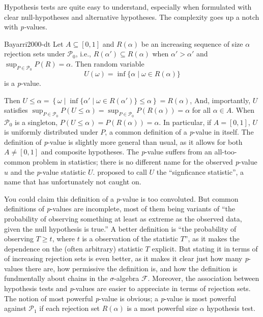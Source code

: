 Hypothesis tests are quite easy to understand, especially when formulated
with clear null-hypotheses and alternative hypotheses. The complexity
goes up a notch with \emph{p-}values.
\begin{definition}
\label{def:p-value}\parencite[][Chapter 3.3]{Lehmann2005-sp}{Bayarri2000-dt} Let
$A\subseteq[0,1]$ and $R(\alpha)$ be an increasing sequence of size
$\alpha$ rejection sets under $\mathcal{P}_{0}$, i.e., $R(\alpha')\subseteq R(\alpha)$
when $\alpha'>\alpha'$ and $\sup_{P\in\mathcal{P}_{0}}P(R)=\alpha$.
Then random variable
\begin{equation}
U(\omega)=\inf\{\alpha\mid\omega\in R(\alpha)\}\label{eq:size p-value}
\end{equation}
is a \emph{p}-value. 
\end{definition}

Then $U\leq\alpha=\left\{ \omega\mid\inf\{\alpha'\mid\omega\in R(\alpha')\}\leq\alpha\right\} =R(\alpha)$,
And, importantly, $U$ satisfies $\sup_{P\in\mathcal{P}_{0}}P(U\leq\alpha)=\sup_{P\in\mathcal{P}_{0}}P(R(\alpha))=\alpha$
for all $\alpha\in A$. When $\mathcal{P}_{0}$ is a singleton, $P(U\leq\alpha)=P(R(\alpha))=\alpha$.
In particular, if $A=[0,1]$, $U$ is uniformly distributed under
$P$, a common definition of a \emph{p}-value in itself. The definition
of \emph{p}-value is slightly more general than usual, as it allows
for both $A\neq[0,1]$ and composite hypotheses. The \emph{p}-value
suffers from an all-too-common problem in statistics; there is no
different name for the observed \emph{p}-value $u$ and the \emph{p}-value
statistic $U$. \cite{Schweder1988-nh} proposed to call $U$ the
``signficance statistic'', a name that has unfortunately not caught
on. 

You could claim this definition of a \emph{p}-value is too convoluted.
But common definitions of\emph{ p}-values are incomplete, most of
them being variants of ``the probability of observing something at
least as extreme as the observed data, given the null hypothesis is
true.'' A better definition is ``the probability of observing $T\geq t$,
where $t$ is a observation of the statistic $T$'', as it makes
the dependence on the (often arbitrary) statistic $T$ explicit. But
stating it in terms of of increasing rejection sets is even better,
as it makes it clear just how many \emph{p}-values there are, how
permissive the definition is, and how the definition is fundmentally
about chains in the $\sigma$-algebra $\mathcal{F}$. Moreover, the
association between hypothesis tests and \emph{p}-values are easier
to appreciate in terms of rejection sets. The notion of most powerful
\emph{p}-value is obvious; a \emph{p}-value is most powerful against
$\mathcal{P}_{1}$ if each rejection set $R(\alpha)$ is a most powerful
size $\alpha$ hypothesis test. 

